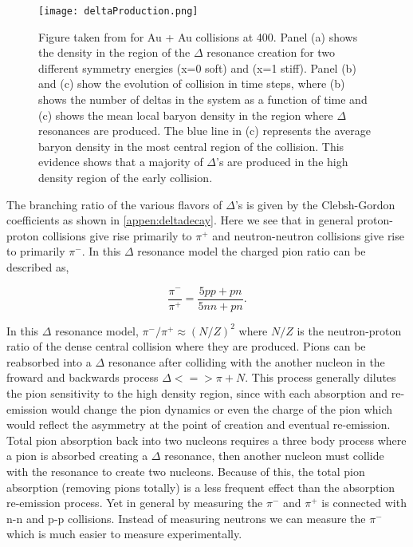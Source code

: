 \begin{figure}[!htb]
\centering
\texttt{[image: deltaProduction.png]}
\caption{Figure taken from \cite{mingzhang} for Au + Au collisions at \SI{400}{\MeVA}. Panel (a) shows the density in the region of the $\Delta$ resonance creation for two different symmetry energies (x=0 soft) and (x=1 stiff). Panel (b) and (c) show the evolution of collision in time steps, where (b) shows the number of deltas in the system as a function of time and (c) shows the mean local baryon density in the region where $\Delta$ resonances are produced. The blue line in (c) represents the average baryon density in the most central region of the collision. This evidence shows that a majority of $\Delta$'s are produced in the high density region of the early collision.}
\label{fig:deltaProduction}
\end{figure}

The branching ratio of the various flavors of $\Delta$'s is given by the Clebsh-Gordon coefficients as shown in \ref{appen:deltadecay}. Here we see that in general proton-proton collisions give rise primarily to  $\pi^+$ and neutron-neutron collisions give rise to primarily $\pi^-$. In this $\Delta$ resonance model the charged pion ratio can be described as,

\begin{equation}
\frac{\pi^-}{\pi^+} = \frac{ 5pp + pn }{5nn + pn}.
\label{eq:deltaModel}
\end{equation}

In this $\Delta$ resonance model, $\pi^-/\pi^+ \approx (N/Z)^2$ where $N/Z$ is the neutron-proton ratio of the dense central collision where they are produced. Pions can be reabsorbed into a $\Delta$ resonance after colliding with the another nucleon in the froward and backwards process $\Delta <=> \pi + N$. This process generally dilutes the pion sensitivity to the high density region, since with each absorption and re-emission would change the pion dynamics or even the charge of the pion which would reflect the asymmetry at the point of creation and eventual re-emission. Total pion absorption back into two nucleons requires a three body process where a pion is absorbed creating a $\Delta$ resonance, then another nucleon must collide with the resonance to create two nucleons. Because of this, the total pion absorption (removing pions totally) is a less frequent effect than the absorption re-emission process. Yet in general by measuring the $\pi^-$ and $\pi^+$ is connected with n-n and p-p collisions. Instead of measuring neutrons we can measure the $\pi^-$ which is much easier to measure experimentally. 

